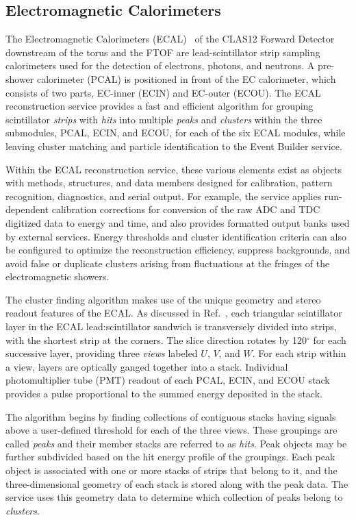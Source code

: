 \subsection{Electromagnetic Calorimeters}

The Electromagnetic Calorimeters (ECAL)~\cite{ecal-nim} of the CLAS12 Forward Detector downstream of the
torus and the FTOF are lead-scintillator strip sampling calorimeters used for the detection of electrons, photons,
and neutrons. A pre-shower calorimeter (PCAL) is positioned in front of the EC calorimeter, which consists of two
parts, EC-inner (ECIN) and EC-outer (ECOU). The ECAL reconstruction service provides a fast
and efficient algorithm for grouping scintillator {\it strips} with {\it hits} into multiple {\it peaks} and {\it clusters}
within the three submodules, PCAL, ECIN, and ECOU, for each of the six ECAL modules, while leaving cluster
matching and particle identification to the Event Builder service.

Within the ECAL reconstruction service, these various elements exist as objects with methods, structures, and data
members designed for calibration, pattern recognition, diagnostics, and serial output. For example, the service applies
run-dependent calibration corrections for conversion of the raw ADC and TDC digitized data to energy and time, and
also provides formatted output banks used by external services.  Energy thresholds and cluster identification criteria
can also be configured to optimize the reconstruction efficiency, suppress backgrounds, and avoid false or duplicate
clusters arising from fluctuations at the fringes of the electromagnetic showers.

The cluster finding algorithm makes use of the unique geometry and stereo readout features of the ECAL. As
discussed in Ref.~\cite{ecal-nim}, each triangular scintillator layer in the ECAL lead:scintillator sandwich is
transversely divided into strips, with the shortest strip at the corners. The slice direction rotates by 120$^\circ$
for each successive layer, providing three {\it views} labeled $U$, $V$, and $W$.  For each strip within a view,
layers are optically ganged together into a stack.  Individual photomultiplier tube (PMT) readout of each PCAL,
ECIN, and ECOU stack provides a pulse proportional to the summed energy deposited in the stack.

The algorithm begins by finding collections of contiguous stacks having signals above a user-defined threshold for
each of the three views. These groupings are called {\it peaks} and their member stacks are referred to as
{\it hits}.  Peak objects may be further subdivided based on the hit energy profile of the groupings. Each peak
object is associated with one or more stacks of strips that belong to it, and the three-dimensional geometry of each
stack is stored along with the peak data. The service uses this geometry data to determine which collection of
peaks belong to {\it clusters}.


